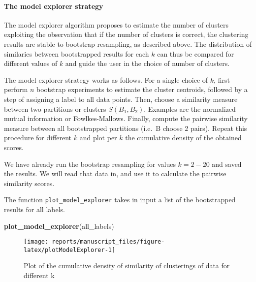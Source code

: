 \documentclass[9pt,a4paper,]{extarticle}
\newenvironment{Shaded}{\begin{snugshade}}{\end{snugshade}}
\newcommand{\KeywordTok}[1]{\textcolor[rgb]{0.13,0.29,0.53}{\textbf{#1}}}
\newcommand{\NormalTok}[1]{#1}
\begin{document}
\hypertarget{the-model-explorer-strategy}{%
\paragraph{The model explorer strategy}\label{the-model-explorer-strategy}}

The model explorer algorithm \citep{ben-hur:stability} proposes to estimate the
number of clusters exploiting the observation that if the number of clusters
is correct, the clustering results are stable to bootstrap resampling, as
described above. The distribution of similaries between bootstrapped results
for each \(k\) can thus be compared for different values of \(k\) and guide the
user in the choice of number of clusters.

The model explorer strategy works as follows. For a single choice of \(k\),
first perform \(n\) bootstrap experiments to estimate the cluster centroids,
followed by a step of assigning a label to all data points. Then, choose a
similarity measure between two partitions or clusters \(S(B_1, B_2)\). Examples
are the normalized mutual information or Fowlkes-Mallows. Finally, compute the
pairwise similarity measure between all bootstrapped partitions (i.e.~B choose
2 pairs). Repeat this procedure for different \(k\) and plot per \(k\) the
cumulative density of the obtained scores.

We have already run the bootstrap resampling for values \(k=2-20\) and saved the
results. We will read that data in, and use it to calculate the pairwise
similarity scores.

The function \texttt{plot\_model\_explorer} takes in input a list of the bootstrapped
results for all labels.

\begin{Shaded}
\begin{Highlighting}[]
\KeywordTok{plot_model_explorer}\NormalTok{(all_labels)}
\end{Highlighting}
\end{Shaded}

\begin{figure}[H]

{\centering \texttt{[image: reports/manuscript\_files/figure-latex/plotModelExplorer-1]} 

}

\caption{Plot of the cumulative density of similarity of clusterings of data for different k}\label{fig:plotModelExplorer}
\end{figure}
\end{document}
